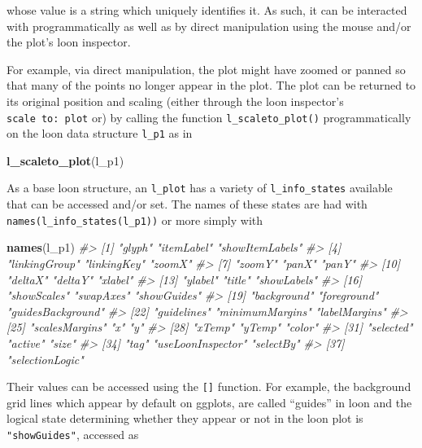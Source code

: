 \documentclass[]{article}
\newenvironment{Shaded}{\begin{snugshade}}{\end{snugshade}}
\newcommand{\KeywordTok}[1]{\textcolor[rgb]{0.13,0.29,0.53}{\textbf{#1}}}
\newcommand{\CommentTok}[1]{\textcolor[rgb]{0.56,0.35,0.01}{\textit{#1}}}
\newcommand{\NormalTok}[1]{#1}
\begin{document}
whose value is a string which uniquely identifies it. As such, it can be
interacted with programmatically as well as by direct manipulation using
the mouse and/or the plot's loon inspector.

For example, via direct manipulation, the plot might have zoomed or
panned so that many of the points no longer appear in the plot. The plot
can be returned to its original position and scaling (either through the
loon inspector's \texttt{scale\ to:\ plot} or) by calling the function
\texttt{l\_scaleto\_plot()} programmatically on the loon data structure
\texttt{l\_p1} as in

\begin{Shaded}
\begin{Highlighting}[]
\KeywordTok{l_scaleto_plot}\NormalTok{(l_p1)}
\end{Highlighting}
\end{Shaded}

As a base loon structure, an \texttt{l\_plot} has a variety of
\texttt{l\_info\_states} available that can be accessed and/or set. The
names of these states are had with
\texttt{names(l\_info\_states(l\_p1))} or more simply with

\begin{Shaded}
\begin{Highlighting}[]
\KeywordTok{names}\NormalTok{(l_p1)}
\CommentTok{#>  [1] "glyph"            "itemLabel"        "showItemLabels"  }
\CommentTok{#>  [4] "linkingGroup"     "linkingKey"       "zoomX"           }
\CommentTok{#>  [7] "zoomY"            "panX"             "panY"            }
\CommentTok{#> [10] "deltaX"           "deltaY"           "xlabel"          }
\CommentTok{#> [13] "ylabel"           "title"            "showLabels"      }
\CommentTok{#> [16] "showScales"       "swapAxes"         "showGuides"      }
\CommentTok{#> [19] "background"       "foreground"       "guidesBackground"}
\CommentTok{#> [22] "guidelines"       "minimumMargins"   "labelMargins"    }
\CommentTok{#> [25] "scalesMargins"    "x"                "y"               }
\CommentTok{#> [28] "xTemp"            "yTemp"            "color"           }
\CommentTok{#> [31] "selected"         "active"           "size"            }
\CommentTok{#> [34] "tag"              "useLoonInspector" "selectBy"        }
\CommentTok{#> [37] "selectionLogic"}
\end{Highlighting}
\end{Shaded}

Their values can be accessed using the \texttt{{[}{]}} function. For
example, the background grid lines which appear by default on ggplots,
are called ``guides'' in loon and the logical state determining whether
they appear or not in the loon plot is \texttt{"showGuides"}, accessed
as
\end{document}
